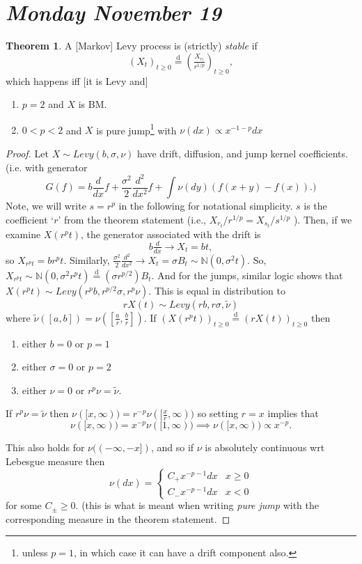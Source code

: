 \documentclass[../../../Master/AppliedStochastics.tex]{subfiles}
\author{Isaac Ahern}  %
\date{November 19 and 21}    %
\newcommand{\disteq}{\overset{ \text{d} }{=}}
\newcommand{\N}{\mathbb{N}}    %
\theoremstyle{definition}
\newtheorem{thm}{Theorem}[section]
\begin{document}
\section{\emph{Monday November 19}} 

\begin{thm}
A [Markov] Levy process is (strictly) \emph{stable} if 
$$
(X_t)_{t \geq 0} \disteq (\tfrac{X_{r_t}}{ r^{1/p}})_{t \geq 0}, 
$$
which happens iff [it is Levy and]
\begin{enumerate}
\item $p = 2$ and $X$ is BM.
\item $0 < p < 2$ and $X$ is pure jump\footnote{unless $p=1$, in which case it can have a drift component also.} with $\nu(dx) \propto x^{-1-p} dx$
\end{enumerate}
\end{thm}

\begin{proof}
Let $X \sim Levy(b,\sigma,\nu)$ have drift, diffusion, and jump kernel coefficients. (i.e. with generator 
$$
G(f) = b \frac{d}{dx} f + \frac{\sigma^2}{2} \frac{d^2}{dx^2} f + \int \nu (dy) (f(x+y) - f(x) ). )
$$ 
Note, we will write $s = r^p$ in the following for notational simplicity. $s$ is the coefficient `$r$' from the theorem statement (i.e., $X_{r_t} / r^{1/p} = X_{s_t} / s^{1/p}$ ). Then, if we examine $X(r^p t)$, the generator associated with the drift is 
$$b \tfrac{d}{dx} \rightarrow X_t = bt,
$$
so $X_{r^p t} = br^p t$. Similarly, $\frac{\sigma^2}{2} \tfrac{d^2}{dx^2} \rightarrow X_t = \sigma B_t \sim \N (0,\sigma^2t)$. So, $X_{r^p t} \sim \N(0, \sigma^2 r^p t) \disteq (\sigma r^{p/2}) B_t$. And for the jumps, similar logic shows that $X(r^p t) \sim Levy ( r^p b, r^{p/2} \sigma, r^p \nu)$. This is equal in distribution to 
$$
r X(t) \sim Levy ( rb, r \sigma, \tilde{\nu})
$$
where $\tilde{\nu}([a,b]) = \nu( [\tfrac{a}{r}, \tfrac{b}{r}] )$. If $(X(r^p t))_{t \geq 0} \disteq (r X(t))_{t \geq 0}$ then 
\begin{enumerate}
\item either $b = 0$ or $p=1$
\item either $\sigma = 0$ or $p=2$
\item either $\nu = 0$ or $r^p \nu = \tilde{\nu}$.
\end{enumerate} 

If $r^p \nu = \tilde{\nu}$ then $\nu ( [x, \infty) ) = r^{-p} \nu ( [\frac{x}{r}, \infty ) )$ so setting $r = x$ implies that 
$$
\nu ( [x , \infty) ) = x^{-p} \nu( [1, \infty) ) \implies \nu ([x, \infty)) \propto x^{-p}.
$$

This also holds for $\nu( (- \infty, -x])$, and so if $\nu$ is absolutely continuous wrt Lebesgue measure then 
$$
\nu(dx) = 
\begin{cases}
C_+ x^{-p-1} dx & x \geq 0 \\
C_{-} x^{-p-1} dx & x < 0
\end{cases}
$$
for some $C_\pm \geq 0$. (this is what is meant when writing \emph{pure jump} with the corresponding measure in the theorem statement.
\end{proof}
\end{document}
